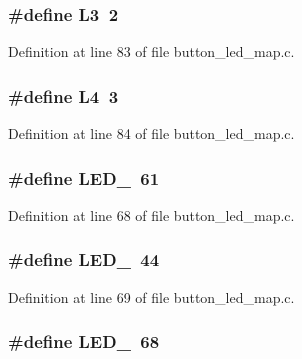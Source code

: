 \subsubsection[{L3}]{\setlength{\rightskip}{0pt plus 5cm}\#define L3~2}\label{button__led__map_8c_a7771a73a8014204aeeecaaf58527b670}


Definition at line 83 of file button\-\_\-led\-\_\-map.\-c.

\subsubsection[{L4}]{\setlength{\rightskip}{0pt plus 5cm}\#define L4~3}\label{button__led__map_8c_a3ede60bb20906da26821f9d2e9ff549f}


Definition at line 84 of file button\-\_\-led\-\_\-map.\-c.

\subsubsection[{L\-E\-D\-\_\-1}]{\setlength{\rightskip}{0pt plus 5cm}\#define L\-E\-D\-\_~61}\label{button__led__map_8c_aaf81f5fa7d1e779f83e9bf4ce631a7b6}


Definition at line 68 of file button\-\_\-led\-\_\-map.\-c.

\subsubsection[{L\-E\-D\-\_\-2}]{\setlength{\rightskip}{0pt plus 5cm}\#define L\-E\-D\-\_~44}\label{button__led__map_8c_ae60a8c1e03b38463f77d556a4a0a8a3b}


Definition at line 69 of file button\-\_\-led\-\_\-map.\-c.

\subsubsection[{L\-E\-D\-\_\-3}]{\setlength{\rightskip}{0pt plus 5cm}\#define L\-E\-D\-\_~68}\label{button__led__map_8c_a07b3fb51ae7c3cc824dd714b46c1b2b6}


